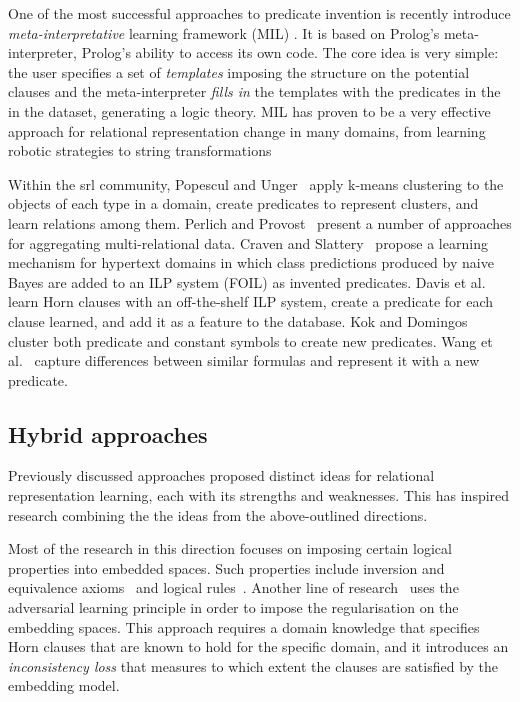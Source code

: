 One of the most successful approaches to predicate invention is recently introduce \textit{meta-interpretative} learning framework (MIL) \cite{MuggletonMIL,Cropper2018,Cropper:2015}.
It is based on Prolog's meta-interpreter, Prolog's ability to access its own code.
The core idea is very simple: the user specifies a set of \textit{templates} imposing the structure on the potential clauses and the meta-interpreter \textit{fills in} the templates with the predicates in the in the dataset, generating a logic theory.
MIL has proven to be a very effective approach for relational representation change in many domains, from learning robotic strategies to string transformations \cite{Cropper2015LearningEL,DBLP:journals/ml/MuggletonDSTWZ18,DBLP:conf/ilp/CropperTM15} 



Within the \gls{srl} community,  Popescul and Unger~\cite{Popescul2004} apply k-means clustering to the objects of each type in a domain, create predicates to represent clusters, and learn relations among them.
Perlich and Provost~\cite{Perlich2003} present a number of approaches for aggregating multi-relational data.
Craven and Slattery~\cite{Craven2001} propose a learning mechanism for hypertext domains in which class predictions produced by naive Bayes are added to an ILP system (FOIL) as invented predicates.
Davis et al.~\cite{DavisOSBPC07} learn Horn clauses with an off-the-shelf ILP system, create a predicate for each clause learned, and add it as a feature to the database.
Kok and Domingos~\cite{Kok2007} cluster both predicate and constant symbols to create new predicates.
Wang et al.~\cite{WangMC15} capture differences between similar formulas and represent it with a new predicate.


 
\subsection{Hybrid approaches}


Previously discussed approaches proposed distinct ideas for relational representation learning, each with its strengths and weaknesses.
This has inspired research combining the the ideas from the above-outlined directions.


Most of the research in this direction focuses on imposing certain logical properties into embedded spaces.
Such properties include inversion and equivalence axioms~\cite{DBLP:conf/pkdd/MinerviniCMNV17} and logical rules~\cite{demeester2016lifted,N15-1118,W14-2409}.
Another line of research~\cite{DBLP:conf/uai/MinerviniDRR17} uses the adversarial learning principle in order to impose the regularisation on the embedding spaces.
This approach requires a domain knowledge that specifies Horn clauses that are known to hold for the specific domain, and it introduces an \textit{inconsistency loss} that measures to which extent the clauses are satisfied by the embedding model.




